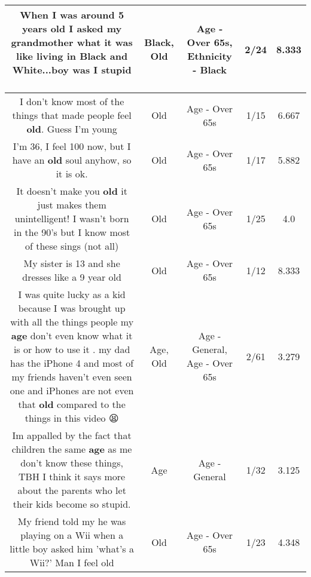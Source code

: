 \documentclass[11pt]{article}
\newlength\mylength
\begin{document}
\begin{center}
\begin{longtable}{|C{.65\mylength}|C{.30\mylength}|C{.12\mylength}|C{.12\mylength}|C{.12\mylength}|}
  \small When I was around 5 years \textbf{old} I asked my grandmother what it was like living in \textbf{Black} and White...boy was I stupid 🤦‍♀️🤷‍♀️\normalsize   & Black, Old & Age - Over 65s, Ethnicity - Black & 2/24 & 8.333 \\  \hline
  \small I don't know most of the things that made people feel \textbf{old}. Guess I'm young\normalsize   & Old & Age - Over 65s & 1/15 & 6.667 \\  \hline
  \small I'm 36, I feel 100 now, but I have an \textbf{old} soul anyhow, so it is ok.\normalsize   & Old & Age - Over 65s & 1/17 & 5.882 \\  \hline
  \small It doesn't make you \textbf{old} it just makes them unintelligent! I wasn't born in the 90's but I know most of these sings (not all)\normalsize   & Old & Age - Over 65s & 1/25 & 4.0 \\  \hline
  \small My sister is 13 and she dresses like a 9 year old\normalsize   & Old & Age - Over 65s & 1/12 & 8.333 \\  \hline
  \small I was quite lucky as a kid because I was brought up with all the things people my \textbf{age} don't even know what it is or how to use it . my dad has the iPhone 4 and most of my friends haven't even seen one and iPhones are not even that \textbf{old} compared to the things in this video 😫\normalsize   & Age, Old & Age - General, Age - Over 65s & 2/61 & 3.279 \\  \hline
  \small Im appalled by the fact that children the same \textbf{age} as me don't know these things, TBH I think it says more about the parents who let their kids become so stupid.\normalsize   & Age & Age - General & 1/32 & 3.125 \\  \hline
  \small My friend told my he was playing on a Wii when a little boy asked him 'what's a Wii?' Man I feel old\normalsize   & Old & Age - Over 65s & 1/23 & 4.348 \\  \hline

\end{longtable}
\end{center}
\end{document}
